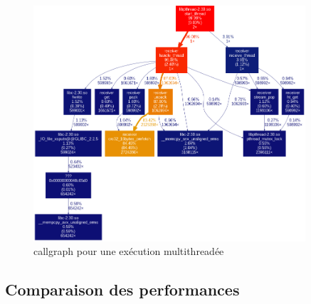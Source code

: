 \documentclass[../main.tex]{subfiles}
\begin{document}
\begin{figure}
    \includegraphics[width=0.9\textwidth]{assets/callgraph.png}
    \caption{callgraph pour une exécution multithreadée}
    \label{sec:graph_mult}
\end{figure}

\newpage

\subsection{Comparaison des performances}
\label{sec:perf_plot}
\end{document}

